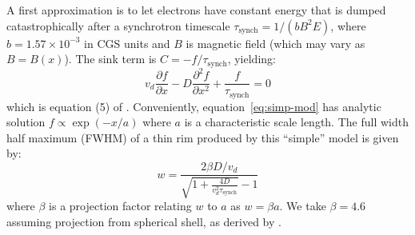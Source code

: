 \documentclass[iop, apj, numberedappendix, twocolappendix]{emulateapj}
\newcommand*{\mt}{\mathrm}
\newcommand*{\ptl}{\partial}
\newcommand*{\tsynch}{\tau_{\mt{synch}}}
\begin{document}
A first approximation is to let electrons have constant energy that is dumped
catastrophically after a synchrotron timescale $\tsynch = 1/(b B^2 E)$, where
$b = 1.57 \times 10^{-3}$ in CGS units and $B$ is magnetic field (which may
vary as $B=B(x)$).  The sink term is $C = -f / \tsynch$, yielding:
\begin{equation} \label{eq:simp-mod}
    v_d \frac{\ptl f}{\ptl x} - D \frac{\ptl^2 f}{\ptl x^2} +
    \frac{f}{\tau_{\mt{synch}}} = 0
\end{equation}
which is equation (5) of .
Conveniently, equation~\eqref{eq:simp-mod} has analytic solution $f \propto
\exp(-x/a)$ where $a$ is a characteristic scale length.  The full width half
maximum (FWHM) of a thin rim produced by this ``simple'' model is given by:
\begin{equation} \label{eq:simp-fwhm}
    w = \frac{2\beta D / v_d}{\sqrt{1 +\frac{4D}{v_d^2 \tsynch}} - 1}
\end{equation}
where $\beta$ is a projection factor relating $w$ to $a$ as $w = \beta a$.  We
take $\beta = 4.6$ assuming projection from spherical shell, as derived by
\citet{ballet2006}.
\end{document}
